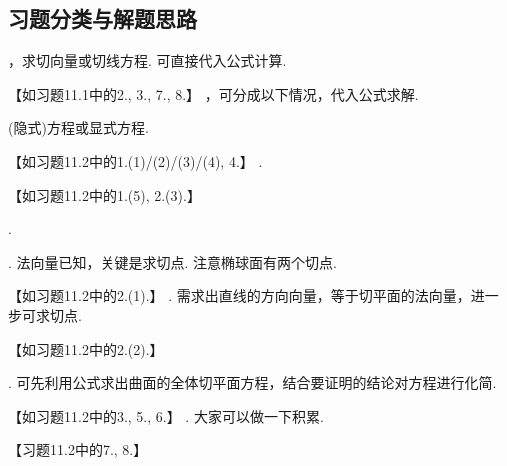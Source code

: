 \documentclass[12pt,UTF8]{ctexart}
\begin{document}
\subsection{习题分类与解题思路}
\begin{enumerate}
，求切向量或切线方程. 可直接代入公式计算.

【如习题11.1中的2., 3., 7., 8.】
，可分成以下情况，代入公式求解.
\begin{enumerate}
(隐式)方程或显式方程.

【如习题11.2中的1.(1)/(2)/(3)/(4), 4.】
.

【如习题11.2中的1.(5), 2.(3).】
\end{enumerate}
.
\begin{enumerate}
. 法向量已知，关键是求切点. 注意椭球面有两个切点.

【如习题11.2中的2.(1).】
. 需求出直线的方向向量，等于切平面的法向量，进一步可求切点. 

【如习题11.2中的2.(2).】
\end{enumerate}
. 可先利用公式求出曲面的全体切平面方程，结合要证明的结论对方程进行化简.

【如习题11.2中的3., 5., 6.】
. 大家可以做一下积累.

【习题11.2中的7., 8.】
\end{enumerate}
\end{document}
